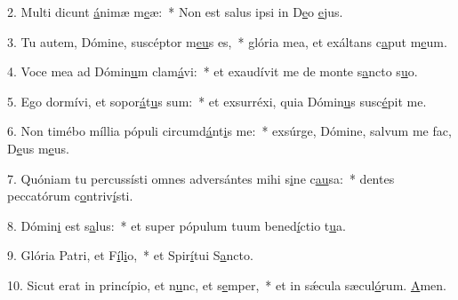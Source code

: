 2. Multi dicunt \uline{á}nimæ m\uline{e}æ:~* Non est salus ipsi in D\uline{e}o \uline{e}jus.\par 
3. Tu autem, Dómine, suscéptor m\uline{e}\uline{u}s es,~* glória mea, et exáltans c\uline{a}put m\uline{e}um.\par 
4. Voce mea ad Dómin\uline{u}m clam\uline{á}vi:~* et exaudívit me de monte s\uline{a}ncto s\uline{u}o.\par 
5. Ego dormívi, et sopor\uline{á}t\uline{u}s sum:~* et exsurréxi, quia Dómin\uline{u}s susc\uline{é}pit me.\par 
6. Non timébo míllia pópuli circumd\uline{á}nt\uline{i}s me:~* exsúrge, Dómine, salvum me fac, D\uline{e}us m\uline{e}us.\par 
7. Quóniam tu percussísti omnes adversántes mihi s\uline{i}ne c\uline{au}sa:~* dentes peccatórum c\uline{o}ntriv\uline{í}sti.\par 
8. Dómin\uline{i} est s\uline{a}lus:~* et super pópulum tuum bened\uline{í}ctio t\uline{u}a.\par 
9. Glória Patri, et F\uline{í}l\uline{i}o,~* et Spir\uline{í}tui S\uline{a}ncto.\par 
10. Sicut erat in princípio, et n\uline{u}nc, et s\uline{e}mper,~* et in sǽcula sæcul\uline{ó}rum. \uline{A}men.\par 
